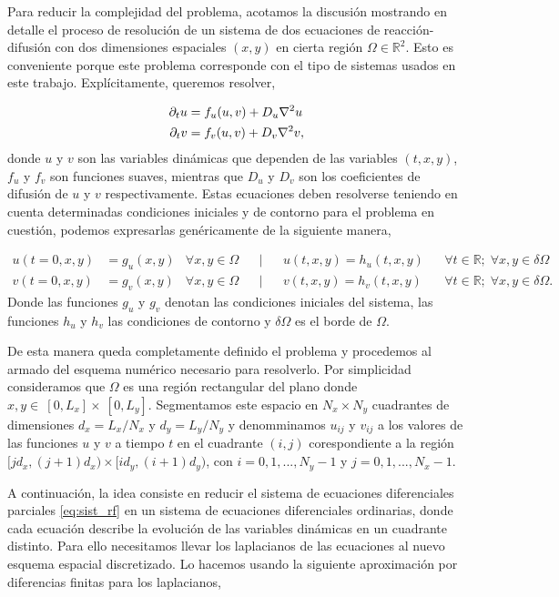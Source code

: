 Para reducir la complejidad del problema, acotamos la discusión mostrando en detalle el proceso de resolución de un sistema de 
dos ecuaciones de reacción-difusión con dos dimensiones espaciales $(x,y)$ en cierta región $\Omega \in \mathbb{R}^2$. Esto es conveniente porque 
este problema corresponde con el tipo de sistemas usados en este trabajo. Explícitamente, queremos resolver,

\begin{equation}
\begin{split}
 \partial_t u & = f_u(u,v) + D_u \laplacian{u}\\
 \partial_t v & = f_v(u,v) + D_v \laplacian{v}, 
\label{eq:sist_rf}
\end{split}
\end{equation}
donde $u$ y $v$ son las variables dinámicas que dependen de las variables $(t,x,y)$, $f_u$ y $f_v$ son funciones suaves, mientras que $D_u$ y $D_v$ 
son los coeficientes de difusión de $u$ y $v$ respectivamente. Estas ecuaciones deben resolverse teniendo en cuenta determinadas condiciones iniciales y 
de contorno para el problema en cuestión, podemos expresarlas genéricamente de la siguiente manera,

\begin{align*}
u(t = 0,x,y) & = g_u(x,y) & \forall x,y \in \Omega &&|&& u(t,x,y) = h_u(t,x,y) && \forall t\in \mathbb{R};\; \forall x,y \in \delta \Omega\\
v(t = 0,x,y) & = g_v(x,y) & \forall x,y \in \Omega &&|&& v(t,x,y) = h_v(t,x,y) && \forall t\in \mathbb{R};\; \forall x,y \in \delta \Omega.
\label{eq:ic}
\end{align*}
Donde las funciones $g_u$ y $g_v$ denotan las condiciones iniciales del sistema, las funciones $h_u$ y $h_v$ las 
condiciones de contorno y $\delta \Omega$ es el borde de $\Omega$.

De esta manera queda completamente definido el problema y procedemos al armado del esquema numérico necesario para resolverlo. Por simplicidad consideramos que $\Omega$
es una región rectangular del plano donde $x,y \in~[0,L_x] \times~[0,L_y]$. Segmentamos este espacio en $N_x \times N_y$ cuadrantes de dimensiones $d_x = L_x/N_x$ y 
$d_y=L_y/N_y$ y denomminamos $u_{ij}$ y $v_{ij}$ a los valores de las funciones $u$ y $v$ a tiempo $t$ en el cuadrante $(i,j)$ corespondiente a la región 
$[jd_x,(j+1)d_x) \times [id_y,(i+1)d_y)$, con $i =0,1,...,N_y-1$ y $j = 0,1,...,N_x-1$.

A continuación, la idea consiste en reducir el sistema de ecuaciones diferenciales parciales \ref{eq:sist_rf} en un sistema de ecuaciones diferenciales ordinarias, donde 
cada ecuación describe la evolución de las variables dinámicas en un cuadrante distinto. Para ello necesitamos llevar los laplacianos de las ecuaciones al nuevo esquema 
espacial discretizado. Lo hacemos usando la siguiente aproximación por diferencias finitas para los laplacianos,

